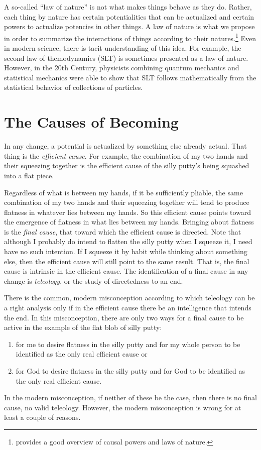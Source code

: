 \documentclass[twocolumn]{article}
\begin{document}
A so-called ``law of nature'' is not what makes things behave as they do.
Rather, each thing by nature has certain potentialities that can be actualized
and certain powers to actualize potencies in other things.  A law of nature is
what we propose in order to summarize the interactions of things according to
their natures.\footnote{%
   \citet[Section 1.2.2.4]{f2014} provides a good overview of causal powers and
   laws of nature.
}
Even in modern science, there is tacit understanding of this idea. For example,
the second law of themodynamics (SLT) is sometimes presented as a law of
nature.  However, in the 20th Century, physicists combining quantum mechanics
and statistical mechanics were able to show that SLT follows mathematically
from the statistical behavior of collections of particles.

\section{The Causes of Becoming}

In any change, a potential is actualized by something else already actual.
That thing is the \emph{efficient cause}.  For example, the combination of my
two hands and their squeezing together is the efficient cause of the silly
putty's being squashed into a flat piece.

Regardless of what is between my hands, if it be sufficiently pliable, the same
combination of my two hands and their squeezing together will tend to produce
flatness in whatever lies between my hands.  So this efficient cause points
toward the emergence of flatness in what lies between my hands.  Bringing about
flatness is the \emph{final cause}, that toward which the efficient cause is
directed.  Note that although I probably do intend to flatten the silly putty
when I squeeze it, I need have no such intention.  If I squeeze it by habit
while thinking about something else, then the efficient cause will still point
to the same result.  That is, the final cause is intrinsic in the efficient
cause.  The identification of a final cause in any change is \emph{teleology},
or the study of directedness to an end.

There is the common, modern misconception according to which teleology can be a
right analysis only if in the efficient cause there be an intelligence that
intends the end.  In this misconception, there are only two ways for a final
cause to be active in the example of the flat blob of silly putty:
\begin{enumerate}
   \item for me to desire flatness in the silly putty and for my whole person
      to be identified as the only real efficient cause or
   \item for God to desire flatness in the silly putty and for God to be
      identified as the only real efficient cause.
\end{enumerate}
In the modern misconception, if neither of these be the case, then there is no
final cause, no valid teleology.  However, the modern misconception is wrong
for at least a couple of reasons.
\end{document}
